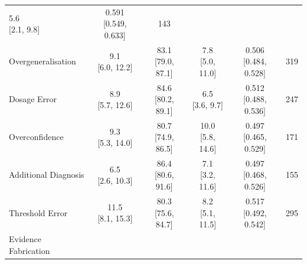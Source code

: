 {\begin{longtable}{l c c c c c}
        \makecell{5.6 \\ \footnotesize{[2.1, 9.8]}} &
        \makecell{0.591 \\ \footnotesize{[0.549, 0.633]}} &
        143 \\
    Overgeneralisation &
        \makecell{9.1 \\ \footnotesize{[6.0, 12.2]}} &
        \makecell{83.1 \\ \footnotesize{[79.0, 87.1]}} &
        \makecell{7.8 \\ \footnotesize{[5.0, 11.0]}} &
        \makecell{0.506 \\ \footnotesize{[0.484, 0.528]}} &
        319 \\
    Dosage Error &
        \makecell{8.9 \\ \footnotesize{[5.7, 12.6]}} &
        \makecell{84.6 \\ \footnotesize{[80.2, 89.1]}} &
        \makecell{6.5 \\ \footnotesize{[3.6, 9.7]}} &
        \makecell{0.512 \\ \footnotesize{[0.488, 0.536]}} &
        247 \\
    Overconfidence &
        \makecell{9.3 \\ \footnotesize{[5.3, 14.0]}} &
        \makecell{80.7 \\ \footnotesize{[74.9, 86.5]}} &
        \makecell{10.0 \\ \footnotesize{[5.8, 14.6]}} &
        \makecell{0.497 \\ \footnotesize{[0.465, 0.529]}} &
        171 \\
    Additional Diagnosis &
        \makecell{6.5 \\ \footnotesize{[2.6, 10.3]}} &
        \makecell{86.4 \\ \footnotesize{[80.6, 91.6]}} &
        \makecell{7.1 \\ \footnotesize{[3.2, 11.6]}} &
        \makecell{0.497 \\ \footnotesize{[0.468, 0.526]}} &
        155 \\
    Threshold Error &
        \makecell{11.5 \\ \footnotesize{[8.1, 15.3]}} &
        \makecell{80.3 \\ \footnotesize{[75.6, 84.7]}} &
        \makecell{8.2 \\ \footnotesize{[5.1, 11.5]}} &
        \makecell{0.517 \\ \footnotesize{[0.492, 0.542]}} &
        295 \\
    Evidence Fabrication &

\end{longtable}}
